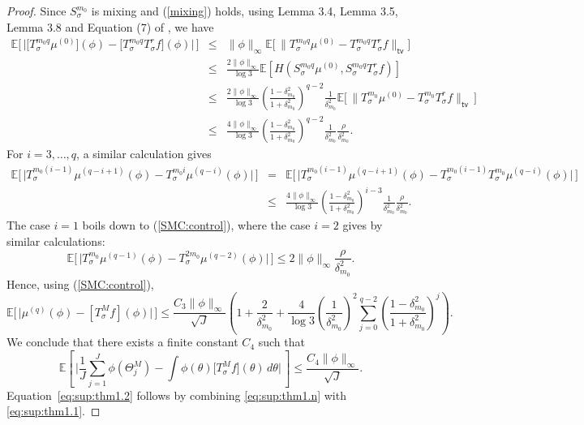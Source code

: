 \documentclass[11pt]{article}
\newcommand\Cb{C_3}
\newcommand\Cc{C_4}
\newcommand\mZero{{m_0}}
\def\PE{\mathbb{E}} %
\begin{document}
\begin{proof}
Since $S_\sigma^{{\mZero}}$ is mixing and (\ref{mixing})  holds, using Lemma 3.4, Lemma 3.5, Lemma 3.8 and Equation (7) of \cite{legland04}, we have
\begin{eqnarray*}
\PE\bigg[\,\Big|\big[T_\sigma^{{\mZero}q}\mu^{(0)}\big](\phi) -\big[T_\sigma^{{\mZero}q}T_\sigma^{r}f\big](\phi)\Big|\,\bigg] 
&\leq & \|\phi\|_\infty \PE\bigg[\,\big\|T_\sigma^{{\mZero}q}\mu^{(0)} - T_\sigma^{{\mZero}q}T_\sigma^{r}f\big\|_{\textsf{tv}}\bigg]\\
& \leq & \frac{2\|\phi\|_\infty}{\log 3}\PE\left[H\left(S_\sigma^{{\mZero}q}\mu^{(0)}, S_\sigma^{{\mZero}q}T_\sigma^rf\right)\right]\\
&\leq& \frac{2\|\phi\|_\infty}{\log 3}\left(\frac{1-\delta^2_{{\mZero}}}{1+\delta^2_{{\mZero}}}\right)^{q-2}\frac{1}{\delta_{{\mZero}}^2}\PE\Big[\,\big\|T_\sigma^{{\mZero}}\mu^{(0)}- T_\sigma^{{\mZero}}T_\sigma^rf\big\|_{\textsf{tv}}\,\Big]\\
&\leq& \frac{4\|\phi\|_\infty}{\log 3}\left(\frac{1-\delta^2_{{\mZero}}}{1+\delta^2_{{\mZero}}}\right)^{q-2}\frac{1}{\delta_{{\mZero}}^2}\frac{\rho}{\delta_{{\mZero}}^2}.
\end{eqnarray*}
For $i=3,\ldots,q$, a similar calculation gives
\begin{eqnarray*}
\PE\bigg[\,\Big|T_\sigma^{{\mZero}(i-1)}\mu^{(q-i+1)}(\phi)-T_\sigma^{{\mZero}i}\mu^{(q-i)}(\phi)\Big|\,\bigg] & = & \PE\bigg[\,\Big|T_\sigma^{{\mZero}(i-1)}\mu^{(q-i+1)}(\phi)-T_\sigma^{{\mZero}(i-1)}T_\sigma^{{\mZero}}\mu^{(q-i)}(\phi)\Big|\,\bigg]\\
&\leq & \frac{4\|\phi\|_\infty}{\log 3}\left(\frac{1-\delta^2_{{\mZero}}}{1+\delta^2_{{\mZero}}}\right)^{i-3}\frac{1}{\delta_{{\mZero}}^2}\frac{\rho}{\delta_{{\mZero}}^2}.\end{eqnarray*}
The case $i=1$ boils down to (\ref{SMC:control}), where the case $i=2$ gives by similar calculations:
\[\PE\bigg[\,\Big|T_\sigma^{{\mZero}}\mu^{(q-1)}(\phi)-T_\sigma^{2{\mZero}}\mu^{(q-2)}(\phi)\Big|\,\bigg] \leq 2\|\phi\|_\infty\frac{\rho}{\delta_{{\mZero}}^2}.\]
Hence, using (\ref{SMC:control}),
\[
\PE\bigg[\,\Big|\mu^{(q)}(\phi)-[T_\sigma^Mf](\phi)\Big|\,\bigg] 
\leq 
\frac{\Cb\|\phi\|_\infty}{\sqrt{J}}\left(1 + \frac{2}{\delta_{{\mZero}}^2} + \frac{4}{\log 3}\left(\frac{1}{\delta_{{\mZero}}^2}\right)^2\sum_{j=0}^{q-2}\left(\frac{1-\delta^2_{{\mZero}}}{1+\delta^2_{{\mZero}}}\right)^{j}\right).
\]
We conclude that there exists a finite constant $\Cc$ such that
\begin{equation}
\label{eq:sup:thm1.n}
\mathbb{E}\left[\,\bigg|\frac{1}{J}\sum_{j=1}^J \phi(\Theta_j^M)- \int \phi(\theta) \big[T_\sigma ^Mf\big](\theta)\, d\theta \bigg|\, \right]\leq \frac{\Cc\|\phi\|_\infty}{\sqrt{J}}.
\end{equation}
Equation~\eqref{eq:sup:thm1.2} follows by combining \eqref{eq:sup:thm1.n} with \eqref{eq:sup:thm1.1}.
\end{proof}
\end{document}
